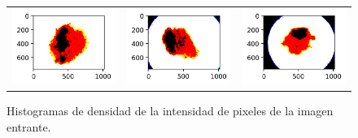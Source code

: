 \begin{figure}[!b]
\begin{tabular}{ccc}
        \includegraphics[width=4cm]{../Plots/THR/filtered_6.png} &
        \includegraphics[width=4cm]{../Plots/THR/filtered_7.png} &
        \includegraphics[width=4cm]{../Plots/THR/filtered_8.png} \\

    \end{tabular}        
    \caption{Histogramas de densidad de la intensidad de pixeles de la imagen entrante.}
    \label{fig:output_1}
\end{figure}

